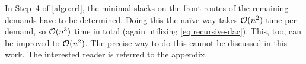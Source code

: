 In Step~4 of \cref{algo:rrl}, the minimal slacks on the front routes of the remaining demands have to be determined.
Doing this the naïve way takes $\mathcal{O}(n^2)$ time per demand, so $\mathcal{O}(n^3)$ time in total (again utilizing \cref{eq:recursive-dac}).
This, too, can be improved to $\mathcal{O}(n^2)$.
The precise way to do this cannot be discussed in this work. 
The interested reader is referred to the appendix.
